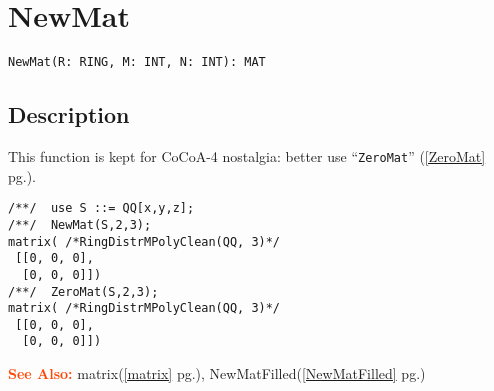 \documentclass[a4paper]{mybook}
\newenvironment{command}{}{} %
\newcommand\SeeAlso{\par\textcolor{OrangeRed}{\textbf{\large See Also: }}}
\begin{document}
\section{NewMat}
\label{NewMat}
\begin{command} %


\begin{Verbatim}[label=syntax, rulecolor=\color{MidnightBlue},
frame=single]
NewMat(R: RING, M: INT, N: INT): MAT
\end{Verbatim}


\subsection*{Description}

This function is kept for CoCoA-4 nostalgia: better use ``\verb&ZeroMat&'' (\ref{ZeroMat} pg.\pageref{ZeroMat}).
\begin{Verbatim}[label=example, rulecolor=\color{PineGreen}, frame=single]
/**/  use S ::= QQ[x,y,z];
/**/  NewMat(S,2,3);
matrix( /*RingDistrMPolyClean(QQ, 3)*/
 [[0, 0, 0],
  [0, 0, 0]])
/**/  ZeroMat(S,2,3);
matrix( /*RingDistrMPolyClean(QQ, 3)*/
 [[0, 0, 0],
  [0, 0, 0]])
\end{Verbatim}


\SeeAlso %
  matrix(\ref{matrix} pg.\pageref{matrix}), 
    NewMatFilled(\ref{NewMatFilled} pg.\pageref{NewMatFilled})
\end{command} %
\end{document}
